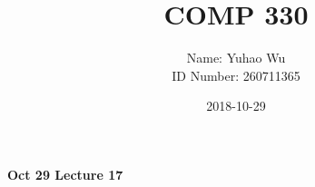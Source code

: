 \documentclass[11pt]{article}
\begin{document}
\title{COMP 330}
\date{2018-10-29}
\author{Name: Yuhao Wu\\
ID Number: 260711365
}
\maketitle

	
\textbf{Oct 29 \quad Lecture 17}\\\\
\end{document}
